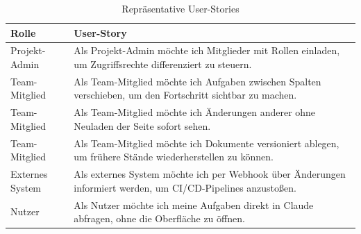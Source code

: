 \begin{table}[ht]
  \centering
  \caption{Repräsentative User-Stories}
  \label{tab:user-stories}
  \begin{tabularx}{\linewidth}{@{}>{\raggedright\arraybackslash}p{3.0cm}X@{}}
    \toprule
    \textbf{Rolle} & \textbf{User-Story} \\
    \midrule
    Projekt-Admin   & Als Projekt-Admin möchte ich Mitglieder mit Rollen einladen, um Zugriffsrechte differenziert zu steuern. \\
    Team-Mitglied   & Als Team-Mitglied möchte ich Aufgaben zwischen Spalten verschieben, um den Fortschritt sichtbar zu machen. \\
    Team-Mitglied   & Als Team-Mitglied möchte ich Änderungen anderer ohne Neuladen der Seite sofort sehen. \\
    Team-Mitglied   & Als Team-Mitglied möchte ich Dokumente versioniert ablegen, um frühere Stände wiederherstellen zu können. \\
    Externes System & Als externes System möchte ich per Webhook über Änderungen informiert werden, um CI/CD-Pipelines anzustoßen. \\
    Nutzer          & Als Nutzer möchte ich meine Aufgaben direkt in Claude abfragen, ohne die Oberfläche zu öffnen. \\
    \bottomrule
  \end{tabularx}
\end{table}
